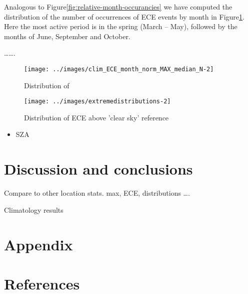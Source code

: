 \documentclass[
]{article}
\providecommand{\tightlist}{%
  \setlength{\itemsep}{0pt}\setlength{\parskip}{0pt}}
\begin{document}
Analogous to Figure\nobreakspace{}\ref{fig:relative-month-occurancies} we have
computed the distribution of the number of occurrences of ECE events by month in
Figure\nobreakspace{}\ref{fig:relative-month-occurancies-ECE}. Here the most active
period is in the spring (March -- May), followed by the months of June, September and
October.

\ldots\ldots.

\begin{figure}[h!]

{\centering \texttt{[image: ../images/clim\_ECE\_month\_norm\_MAX\_median\_N-2]} 

}

\caption{Distribution of }\label{fig:relative-month-occurancies-ECE}
\end{figure}

\begin{figure}[h!]

{\centering \texttt{[image: ../images/extremedistributions-2]} 

}

\caption{Distribution of ECE above 'clear sky' reference}\label{fig:unnamed-chunk-4}
\end{figure}

\begin{itemize}
\tightlist
\item
  SZA
\end{itemize}

\FloatBarrier

\hypertarget{discussion-and-conclusions}{%
\section{Discussion and conclusions}\label{discussion-and-conclusions}}

Compare to other location stats.
max, ECE, distributions \ldots.

Climatology results

\hypertarget{appendix}{%
\section*{Appendix}\label{appendix}}

\hypertarget{references}{%
\section*{References}\label{references}}
\end{document}
